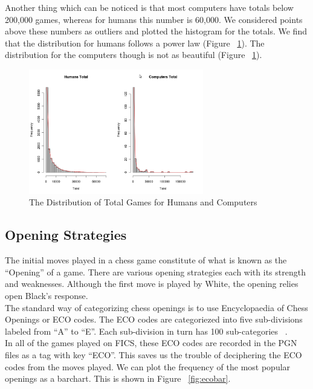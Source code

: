 \documentclass{article}
\begin{document}
Another thing which can be noticed is that most computers have totals below 200,000 games, whereas for humans this number is 60,000. We considered points above these numbers as outliers and plotted the histogram for the totals. We find that the distribution for humans follows a power law (Figure ~\ref{fig:totalsdistr}). The distribution for the computers though is not as beautiful (Figure ~\ref{fig:totalsdistr}).\\

\begin{figure} [htp]
\begin{center}
\includegraphics[width=3in]{totals_distr.png}
\end{center}
\caption{The Distribution of Total Games for Humans and Computers}
\label{fig:totalsdistr}
\end{figure}

\clearpage
\subsection{Opening Strategies}
The initial moves played in a chess game constitute of what is known as the ``Opening'' of a game. There are various opening strategies each with its strength and weaknesses. Although the first move is played by White, the opening relies open Black's response.\\

The standard way of categorizing chess openings is to use Encyclopaedia of Chess Openings or ECO codes. The ECO codes are categoriezed into five sub-divisions labeled from ``A'' to ``E''. Each sub-division in turn has 100 sub-categories ~\cite{wiki:eco}.\\

In all of the games played on FICS, these ECO codes are recorded in the PGN files as a tag with key ``ECO''. This saves us the trouble of deciphering the ECO codes from the moves played. We can plot the frequency of the most popular openings as a barchart. This is shown in Figure ~\ref{fig:ecobar}.
\end{document}
